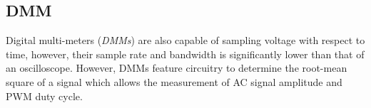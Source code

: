 \documentclass[main.tex]{subfiles}
\begin{document}
\subsection{DMM}
Digital multi-meters (\textit{DMMs}) are also capable of sampling voltage with respect to time, however, their sample rate and bandwidth is significantly lower than that of an oscilloscope. However, DMMs feature circuitry to determine the root-mean square of a signal which allows the measurement of AC signal amplitude and PWM duty cycle.
\end{document}
